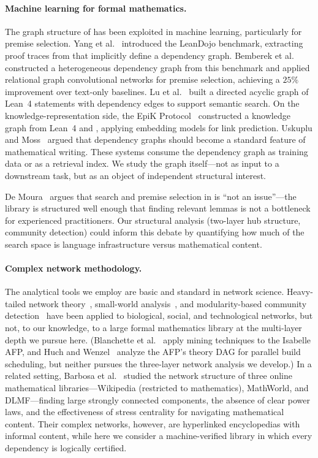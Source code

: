\paragraph{Machine learning for formal mathematics.}
The graph structure of  has been exploited in machine learning, particularly for premise selection. Yang et al.~\cite{leandojo} introduced the LeanDojo benchmark, extracting proof traces from  that implicitly define a dependency graph. Bemberek et al.~\cite{bemberek2025} constructed a heterogeneous dependency graph from this benchmark and applied relational graph convolutional networks for premise selection, achieving a $25\%$ improvement over text-only baselines. Lu et al.~\cite{leanfinder} built a directed acyclic graph of Lean~4 statements with dependency edges to support semantic search. On the knowledge-representation side, the EpiK Protocol~\cite{epik2024} constructed a knowledge graph from Lean~4 and , applying embedding models for link prediction. Uskuplu and Moss~\cite{knowtex2025} argued that dependency graphs should become a standard feature of mathematical writing. These systems consume the dependency graph as training data or as a retrieval index. We study the graph itself---not as input to a downstream task, but as an object of independent structural interest.

De Moura~\cite{demoura2026proofassistants} argues that search and premise selection in  is ``not an issue''---the library is structured well enough that finding relevant lemmas is not a bottleneck for experienced practitioners. Our structural analysis (two-layer hub structure, community detection) could inform this debate by quantifying how much of the search space is language infrastructure versus mathematical content.

\paragraph{Complex network methodology.}
The analytical tools we employ are basic and standard in network science. Heavy-tailed network theory~\cite{barabasi1999}, small-world analysis~\cite{watts1998}, and modularity-based community detection~\cite{newman2004,blondel2008} have been applied to biological, social, and technological networks, but not, to our knowledge, to a large formal mathematics library at the multi-layer depth we pursue here. (Blanchette et al.~\cite{blanchette2015} apply mining techniques to the Isabelle AFP, and Huch and Wenzel~\cite{huch2024} analyze the AFP's theory DAG for parallel build scheduling, but neither pursues the three-layer network analysis we develop.) In a related setting, Barbosa et al.~\cite{barbosa2013} studied the network structure of three online mathematical libraries---Wikipedia (restricted to mathematics), MathWorld, and DLMF---finding large strongly connected components, the absence of clear power laws, and the effectiveness of stress centrality for navigating mathematical content. Their complex networks, however, are hyperlinked encyclopedias with informal content, while here we consider a machine-verified library in which every dependency is logically certified.

